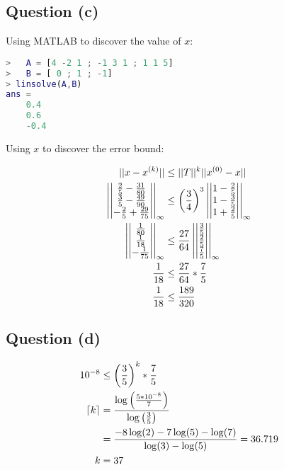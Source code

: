 	\subsection{Question (c)}

		Using MATLAB to discover the value of $x$:

		\begin{lstlisting}[language=MATLAB]
>	A = [4 -2 1 ; -1 3 1 ; 1 1 5]
>	B = [ 0 ; 1 ; -1]
> linsolve(A,B)
ans =
	0.4
	0.6
	-0.4
		\end{lstlisting}

		Using $x$ to discover the error bound:

		\begin{align}
			||x-x^{(k)}|| &\leq ||T||^{k}||x^{(0)}-x||
			& \\
			\left|\left|
			\begin{matrix}
				\frac{2}{5} - \frac{31}{80} \\
				\frac{3}{5} - \frac{49}{90} \\
				-\frac{2}{5} + \frac{29}{75}
			\end{matrix}
			\right|\right|_{\infty}
			&\leq \left(\frac{3}{4}\right)^{3}
			\left|\left|
			\begin{matrix}
				1 - \frac{2}{5} \\
				1 - \frac{3}{5} \\
				1 + \frac{2}{5}
			\end{matrix}
			\right|\right|_{\infty}
			& \notag \\
			\left|\left|
			\begin{matrix}
				\frac{1}{80} \\
				\frac{1}{18} \\
				-\frac{1}{75}
			\end{matrix}
			\right|\right|_{\infty}
			&\leq \frac{27}{64}
			\left|\left|
			\begin{matrix}
				\frac{3}{5} \\
				\frac{2}{5} \\
				\frac{7}{5}
			\end{matrix}
			\right|\right|_{\infty}
			& \notag \\
			\frac{1}{18} & \leq \frac{27}{64}*\frac{7}{5}
			& \notag \\
			\frac{1}{18} & \leq \frac{189}{320}
		\end{align}

	\subsection{Question (d)}
		\begin{align}
			10^{-8} &\leq \left(\frac{3}{5}\right)^{k}*\frac{7}{5}
			& \notag \\
			\lceil k \rceil &=  \frac{\log\left({\frac{5*10^{-8}}{7}}\right)}{\log\left({\frac{3}{5}}\right)}& \notag \\
			&= \frac{-8\log(2) -7\log(5) - \log(7)}{\log(3) - \log(5)} = 36.719& \notag \\
			k &= 37&	
		\end{align}